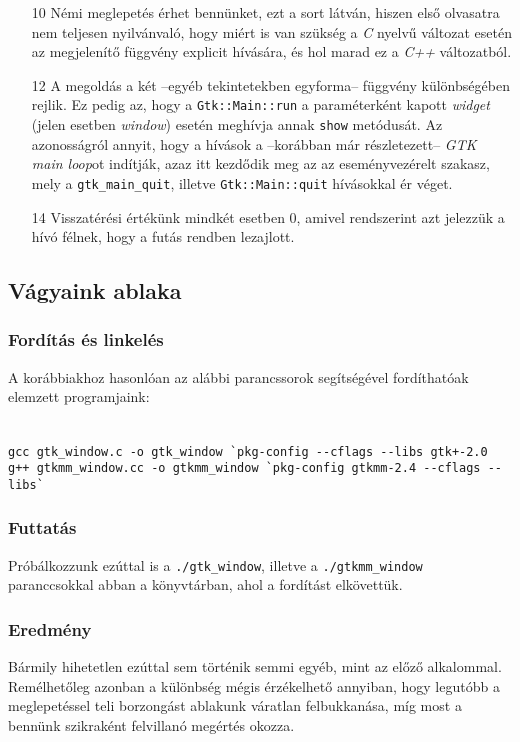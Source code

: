 \documentclass[a4paper,10pt]{article}
\begin{document}
\begin{enumerate}
 \item[10] Némi meglepetés érhet bennünket, ezt a sort látván, hiszen első olvasatra nem teljesen nyilvánvaló, hogy miért is van szükség a \textit{C} nyelvű változat esetén az megjelenítő függvény explicit hívására, és hol marad ez a \textit{C++} változatból.

 \item[12] A megoldás a két --egyéb tekintetekben egyforma-- függvény különbségében rejlik. Ez pedig az, hogy a \texttt{Gtk::Main::run} a paraméterként kapott \textit{widget} (jelen esetben \textit{window}) esetén meghívja annak \texttt{show} metódusát. Az azonosságról annyit, hogy a hívások a --korábban már részletezett-- \textit{GTK main loop}ot indítják, azaz itt kezdődik meg az az eseményvezérelt szakasz, mely a \texttt{gtk\_main\_quit}, illetve \texttt{Gtk::Main::quit} hívásokkal ér véget.

 \item[14] Visszatérési értékünk mindkét esetben 0, amivel rendszerint azt jelezzük a hívó félnek, hogy a futás rendben lezajlott.
\end{enumerate}

\subsection{Vágyaink ablaka}

\subsubsection{Fordítás és linkelés}

A korábbiakhoz hasonlóan az alábbi parancssorok segítségével fordíthatóak e\-lem\-zett programjaink:

\fontsize{8pt}{8pt}
\ \\
\texttt{gcc gtk\_window.c -o gtk\_window \`{}pkg-config {-}-cflags {-}-libs gtk+-2.0}
\ \\
\texttt{g++ gtkmm\_window.cc -o gtkmm\_window \`{}pkg-config gtkmm-2.4 {-}-cflags {-}-libs\`{}}

\subsubsection{Futtatás}

Próbálkozzunk ezúttal is a \texttt{./gtk\_window}, illetve a \texttt{./gtkmm\_window} paranccsokkal abban a könyvtárban, ahol a fordítást elkövettük.

\subsubsection{Eredmény}

Bármily hihetetlen ezúttal sem történik semmi egyéb, mint az előző alkalommal. Remélhetőleg azonban a különbség mégis érzékelhető annyiban, hogy legutóbb a meglepetéssel teli borzongást ablakunk váratlan felbukkanása, míg most a bennünk szikraként felvillanó megértés okozza.

\nocite{gtktut}
\nocite{gtkmmtut}
\nocite{ggad}
\nocite{gtktutmagy}



\end{document}

